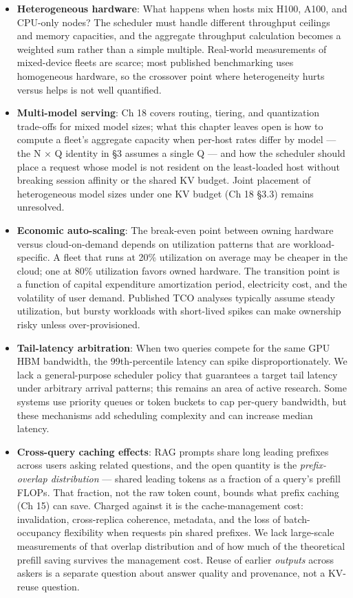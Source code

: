 \begin{itemize}
\item
  \textbf{Heterogeneous hardware}: What happens when hosts mix H100,
  A100, and CPU-only nodes? The scheduler must handle different
  throughput ceilings and memory capacities, and the aggregate
  throughput calculation becomes a weighted sum rather than a simple
  multiple. Real-world measurements of mixed-device fleets are scarce;
  most published benchmarking uses homogeneous hardware, so the
  crossover point where heterogeneity hurts versus helps is not well
  quantified.
\item
  \textbf{Multi-model serving}: Ch 18 covers routing, tiering, and
  quantization trade-offs for mixed model sizes; what this chapter
  leaves open is how to compute a fleet's aggregate capacity when
  per-host rates differ by model --- the N × Q identity in §3 assumes a
  single Q --- and how the scheduler should place a request whose model
  is not resident on the least-loaded host without breaking session
  affinity or the shared KV budget. Joint placement of heterogeneous
  model sizes under one KV budget (Ch 18 §3.3) remains unresolved.
\item
  \textbf{Economic auto-scaling}: The break-even point between owning
  hardware versus cloud-on-demand depends on utilization patterns that
  are workload-specific. A fleet that runs at 20\% utilization on
  average may be cheaper in the cloud; one at 80\% utilization favors
  owned hardware. The transition point is a function of capital
  expenditure amortization period, electricity cost, and the volatility
  of user demand. Published TCO analyses typically assume steady
  utilization, but bursty workloads with short-lived spikes can make
  ownership risky unless over-provisioned.
\item
  \textbf{Tail-latency arbitration}: When two queries compete for the
  same GPU HBM bandwidth, the 99th-percentile latency can spike
  disproportionately. We lack a general-purpose scheduler policy that
  guarantees a target tail latency under arbitrary arrival patterns;
  this remains an area of active research. Some systems use priority
  queues or token buckets to cap per-query bandwidth, but these
  mechanisms add scheduling complexity and can increase median latency.
\item
  \textbf{Cross-query caching effects}: RAG prompts share long leading
  prefixes across users asking related questions, and the open quantity
  is the \emph{prefix-overlap distribution} --- shared leading tokens as
  a fraction of a query's prefill FLOPs. That fraction, not the raw
  token count, bounds what prefix caching (Ch 15) can save. Charged
  against it is the cache-management cost: invalidation, cross-replica
  coherence, metadata, and the loss of batch-occupancy flexibility when
  requests pin shared prefixes. We lack large-scale measurements of that
  overlap distribution and of how much of the theoretical prefill saving
  survives the management cost. Reuse of earlier \emph{outputs} across
  askers is a separate question about answer quality and provenance, not
  a KV-reuse question.
\end{itemize}

